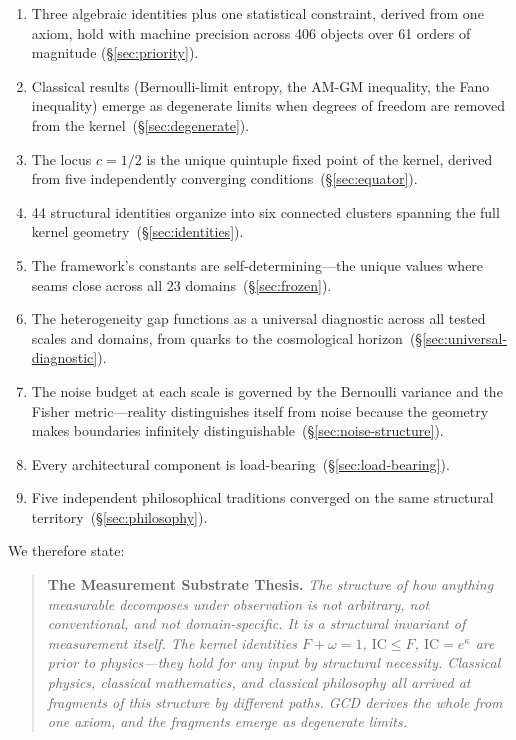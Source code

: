 \documentclass[
  aps,
  prd,
  twocolumn,
  superscriptaddress,
  nofootinbib,
  floatfix
]{revtex4-2}
\newcommand{\IC}{\mathrm{IC}}
\begin{document}
\begin{enumerate}[leftmargin=*,label=(\arabic*)]
\item Three algebraic identities plus one statistical constraint,
  derived from one axiom, hold with machine precision across 406
  objects over 61 orders of magnitude (\S\ref{sec:priority}).

\item Classical results (Bernoulli-limit entropy, the AM-GM
  inequality, the Fano inequality) emerge as degenerate limits when
  degrees of freedom are removed from the
  kernel~(\S\ref{sec:degenerate}).

\item The locus $c = 1/2$ is the unique quintuple fixed point of the
  kernel, derived from five independently converging
  conditions~(\S\ref{sec:equator}).

\item 44 structural identities organize into six connected clusters
  spanning the full kernel geometry~(\S\ref{sec:identities}).

\item The framework's constants are self-determining---the unique
  values where seams close across all 23 domains~(\S\ref{sec:frozen}).

\item The heterogeneity gap functions as a universal diagnostic
  across all tested scales and domains, from quarks to the
  cosmological horizon~(\S\ref{sec:universal-diagnostic}).

\item The noise budget at each scale is governed by the Bernoulli
  variance and the Fisher metric---reality distinguishes itself
  from noise because the geometry makes boundaries infinitely
  distinguishable~(\S\ref{sec:noise-structure}).

\item Every architectural component is
  load-bearing~(\S\ref{sec:load-bearing}).

\item Five independent philosophical traditions converged on the
  same structural territory~(\S\ref{sec:philosophy}).
\end{enumerate}

We therefore state:

\begin{quote}
\textbf{The Measurement Substrate Thesis.}
\emph{The structure of how anything measurable decomposes under
observation is not arbitrary, not conventional, and not
domain-specific.  It is a structural invariant of measurement
itself.  The kernel identities $F + \omega = 1$, $\IC \leq F$,
$\IC = e^\kappa$ are prior to physics---they hold for any input by
structural necessity.  Classical physics, classical mathematics, and
classical philosophy all arrived at fragments of this structure by
different paths.  GCD derives the whole from one axiom, and the
fragments emerge as degenerate limits.}
\end{quote}
\end{document}
